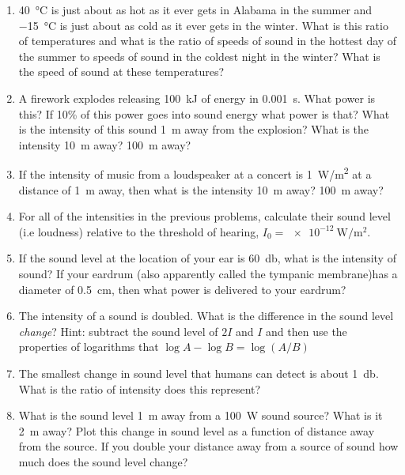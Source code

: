 \begin{enumerate}
	\item
	\SI{40}{\celsius} is just about as hot as it ever gets in Alabama in the summer and \SI{-15}{\celsius} is just about as cold as it ever gets in the winter. What is this ratio of temperatures and what is the ratio of speeds of sound in the hottest day of the summer to speeds of sound in the coldest night in the winter? What is the speed of sound at these temperatures?
	
	\item  
	A firework explodes releasing \SI{100}{\kilo\joule} of energy in \SI{0.001}{\second}. What power is this? If 10\% of this power goes into sound energy what power is that? What is the intensity of this sound \SI{1}{\meter} away from the explosion? What is the intensity \SI{10}{\meter} away? \SI{100}{\meter} away?
	
	\item
	If the intensity of music from a loudspeaker at a concert is \SI{1}{\watt/\meter^2} at a distance of \SI{1}{m} away, then what is the intensity \SI{10}{\meter} away? \SI{100}{\meter} away? 
	
	\item
	For all of the intensities in the previous problems, calculate their sound level (i.e loudness) relative to the threshold of hearing, $I_0=\SI{e-12}{\watt/\meter^2}$.
	
	\item
	If the sound level at the location of your ear is \SI{60}{\decibel}, what is the intensity of sound? If your eardrum (also apparently called the tympanic membrane)has a diameter of \SI{0.5}{cm}, then what power is delivered to your eardrum?
	
	\item
	The intensity of a sound is doubled. What is the difference in the sound level \emph{change}? {Hint: subtract the sound level of $2I$ and $I$ and then use the properties of logarithms that $\log A - \log B = \log\left(A/B\right)$}
	
	\item 
	The smallest change in sound level that humans can detect is about \SI{1}{\decibel}. What is the ratio of intensity does this represent?
	\bigskip
	\item
	What is the sound level \SI{1}{\meter} away from a \SI{100}{\watt} sound source? What is it \SI{2}{\meter} away? Plot this change in sound level as a function of distance away from the source. If you double your distance away from a source of sound how much does the sound level change?\bigskip
	

\end{enumerate}
